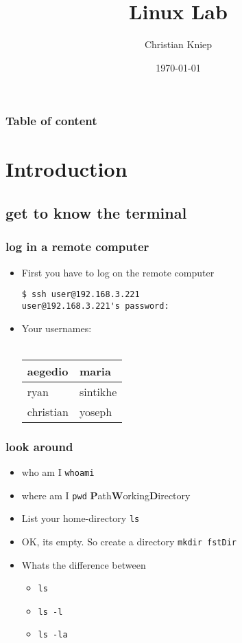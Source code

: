 \documentclass[hyperref={pdfpagelabels=false}]{beamer}
\author{Christian Kniep}
\newcommand{\code}[1]{\colorbox{lGray}{\texttt{#1}}}
\begin{document}
\title[Linux Lab]{Linux Lab}  
\date[\today]{\today} 

\begin{frame}
	\titlepage
\end{frame} 

\begin{frame}
	\frametitle{Table of content}
	\tableofcontents
\end{frame} 


\section{Introduction} 
	\subsection{get to know the terminal}
		\begin{frame}[fragile]
			\frametitle{log in a remote computer}
			\begin{itemize}
				\item<1-> First you have to log on the remote computer \\
                        \begin{verbatim}
$ ssh user@192.168.3.221
user@192.168.3.221's password: 
\end{verbatim}
                \item<2-> Your usernames: \\ \ \\
                \begin{tabular}{|l|l|} \hline
                aegedio & maria \\ \hline
                ryan & sintikhe \\ \hline
                christian & yoseph \\ \hline
                \end{tabular}
            \end{itemize}
		\end{frame}
        \begin{frame}
			\frametitle{look around}
			\begin{itemize}
                \item<1-> who am I \code{whoami}
                \item<2-> where am I \code{pwd} \textbf{P}ath\textbf{W}orking\textbf{D}irectory
				\item<3-> List your home-directory \code{ls}
                \item<4-> OK, its empty. So create a directory \code{mkdir fstDir}
                \item<5-> Whats the difference between
                \begin{itemize}
                    \item<5-> \code{ls}
                    \item<5-> \code{ls -l}
                    \item<5-> \code{ls -la}                    
                \end{itemize}
            \end{itemize}
		\end{frame}
\end{document}

